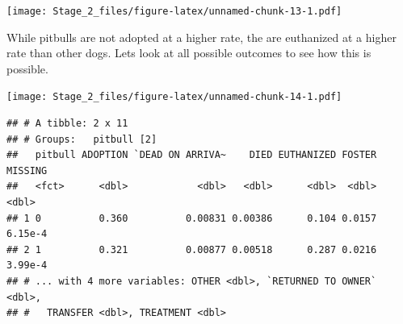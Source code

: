 \documentclass[]{article}
\newenvironment{Shaded}{\begin{snugshade}}{\end{snugshade}}
\newcommand{\KeywordTok}[1]{\textcolor[rgb]{0.13,0.29,0.53}{\textbf{#1}}}
\newcommand{\DataTypeTok}[1]{\textcolor[rgb]{0.13,0.29,0.53}{#1}}
\newcommand{\DecValTok}[1]{\textcolor[rgb]{0.00,0.00,0.81}{#1}}
\newcommand{\StringTok}[1]{\textcolor[rgb]{0.31,0.60,0.02}{#1}}
\newcommand{\OperatorTok}[1]{\textcolor[rgb]{0.81,0.36,0.00}{\textbf{#1}}}
\newcommand{\NormalTok}[1]{#1}
\begin{document}
\texttt{[image: Stage\_2\_files/figure-latex/unnamed-chunk-13-1.pdf]}

While pitbulls are not adopted at a higher rate, the are euthanized at a
higher rate than other dogs. Lets look at all possible outcomes to see
how this is possible.

\begin{Shaded}
\end{Shaded}

\texttt{[image: Stage\_2\_files/figure-latex/unnamed-chunk-14-1.pdf]}

\begin{Shaded}
\end{Shaded}

\begin{verbatim}
## # A tibble: 2 x 11
## # Groups:   pitbull [2]
##   pitbull ADOPTION `DEAD ON ARRIVA~    DIED EUTHANIZED FOSTER MISSING
##   <fct>      <dbl>            <dbl>   <dbl>      <dbl>  <dbl>   <dbl>
## 1 0          0.360          0.00831 0.00386      0.104 0.0157 6.15e-4
## 2 1          0.321          0.00877 0.00518      0.287 0.0216 3.99e-4
## # ... with 4 more variables: OTHER <dbl>, `RETURNED TO OWNER` <dbl>,
## #   TRANSFER <dbl>, TREATMENT <dbl>
\end{verbatim}
\end{document}
